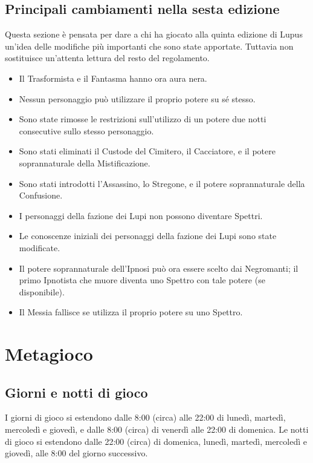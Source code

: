 \documentclass[a4paper,10pt]{article}
\begin{document}
\subsection{Principali cambiamenti nella sesta edizione}

Questa sezione è pensata per dare a chi ha giocato alla quinta edizione di Lupus un'idea delle modifiche più importanti che sono state apportate. Tuttavia non sostituisce un'attenta lettura del resto del regolamento.

\begin{itemize}
  \item Il Trasformista e il Fantasma hanno ora aura nera.
  \item Nessun personaggio può utilizzare il proprio potere su sé stesso.
  \item Sono state rimosse le restrizioni sull'utilizzo di un potere due notti consecutive sullo stesso personaggio.
  \item Sono stati eliminati il Custode del Cimitero, il Cacciatore, e il potere soprannaturale della Mistificazione.
  \item Sono stati introdotti l'Assassino, lo Stregone, e il potere soprannaturale della Confusione.
  \item I personaggi della fazione dei Lupi non possono diventare Spettri.
  \item Le conoscenze iniziali dei personaggi della fazione dei Lupi sono state modificate.
  \item Il potere soprannaturale dell'Ipnosi può ora essere scelto dai Negromanti; il primo Ipnotista che muore diventa uno Spettro con tale potere (se disponibile).
  \item Il Messia fallisce se utilizza il proprio potere su uno Spettro.
\end{itemize}




\pagebreak
\section{Metagioco}

\subsection{Giorni e notti di gioco}

I giorni di gioco si estendono dalle 8:00 (circa) alle 22:00 di lunedì, martedì, mercoledì e giovedì, e dalle 8:00 (circa) di venerdì alle 22:00 di domenica. Le notti di gioco si estendono dalle 22:00 (circa) di domenica, lunedì, martedì, mercoledì e giovedì, alle 8:00 del giorno successivo.
\end{document}
